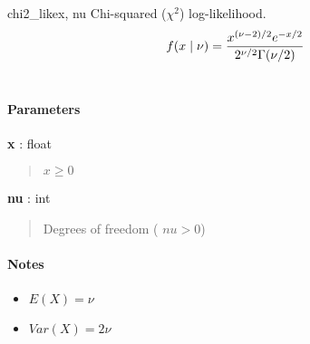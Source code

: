 \hypertarget{pymc.distributions.chi2_like}{}
\begin{funcdesc}{chi2\_like}{x, nu}
Chi-squared ($\chi^2$) log-likelihood.
\begin{gather}
\begin{split}f(x \mid \nu) = \frac{x^{(\nu-2)/2}e^{-x/2}}{2^{\nu/2}\Gamma(\nu/2)}\end{split}\notag\\\begin{split}\end{split}\notag
\end{gather}
\paragraph{Parameters}
\begin{paramlist}
\item[] \textbf{x} : float
\begin{quote}

$x \ge 0$
\end{quote}

\item[] \textbf{nu} : int
\begin{quote}

Degrees of freedom ( $nu > 0$)
\end{quote}
\end{paramlist}
\paragraph{Notes}
\begin{itemize}
\item {} 
$E(X)=\nu$

\item {} 
$Var(X)=2\nu$

\end{itemize}
\end{funcdesc}

